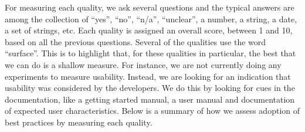 \documentclass[final, 3p, times, authoryear]{elsarticle}
\begin{document}
For measuring each quality, we ask several questions and the typical answers are
among the collection of ``yes'', ``no'', ``n/a'', ``unclear'', a number, a
string, a date, a set of strings, etc. Each quality is assigned an overall
score, between 1 and 10, based on all the previous questions.  Several of the
qualities use the word ``surface''.  This is to highlight that, for these
qualities in particular, the best that we can do is a shallow measure.  For
instance, we are not currently doing any experiments to measure usability.
Instead, we are looking for an indication that usability was considered by the
developers.  We do this by looking for cues in the documentation, like a getting
started manual, a user manual and documentation of expected user
characteristics.  Below is a summary of how we assess adoption of best practices
by measuring each quality.
\end{document}
